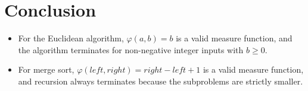 \documentclass[12pt]{article}
\begin{document}
\bigskip

\section*{Conclusion}

\begin{itemize}
    \item For the Euclidean algorithm, $\varphi(a,b)=b$ is a valid measure function, and the algorithm terminates for non-negative integer inputs with $b \geq 0$.
    \item For merge sort, $\varphi(left,right) = right - left + 1$ is a valid measure function, and recursion always terminates because the subproblems are strictly smaller.
\end{itemize}
\end{document}
